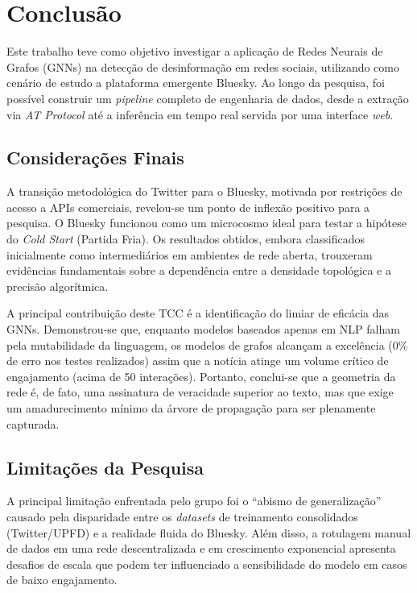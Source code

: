 \chapter{Conclusão}

Este trabalho teve como objetivo investigar a aplicação de Redes Neurais de Grafos (GNNs) na detecção de desinformação em redes sociais, utilizando como cenário de estudo a plataforma emergente Bluesky. Ao longo da pesquisa, foi possível construir um \textit{pipeline} completo de engenharia de dados, desde a extração via \textit{AT Protocol} até a inferência em tempo real servida por uma interface \textit{web}.

\section{Considerações Finais}

A transição metodológica do Twitter para o Bluesky, motivada por restrições de acesso a APIs comerciais, revelou-se um ponto de inflexão positivo para a pesquisa. O Bluesky funcionou como um microcosmo ideal para testar a hipótese do \textit{Cold Start} (Partida Fria). Os resultados obtidos, embora classificados inicialmente como intermediários em ambientes de rede aberta, trouxeram evidências fundamentais sobre a dependência entre a densidade topológica e a precisão algorítmica.

A principal contribuição deste TCC é a identificação do limiar de eficácia das GNNs. Demonstrou-se que, enquanto modelos baseados apenas em NLP falham pela mutabilidade da linguagem, os modelos de grafos alcançam a excelência (0\% de erro nos testes realizados) assim que a notícia atinge um volume crítico de engajamento (acima de 50 interações). Portanto, conclui-se que a geometria da rede é, de fato, uma assinatura de veracidade superior ao texto, mas que exige um amadurecimento mínimo da árvore de propagação para ser plenamente capturada.

\section{Limitações da Pesquisa}

A principal limitação enfrentada pelo grupo foi o ``abismo de generalização'' causado pela disparidade entre os \textit{datasets} de treinamento consolidados (Twitter/UPFD) e a realidade fluida do Bluesky. Além disso, a rotulagem manual de dados em uma rede descentralizada e em crescimento exponencial apresenta desafios de escala que podem ter influenciado a sensibilidade do modelo em casos de baixo engajamento.

